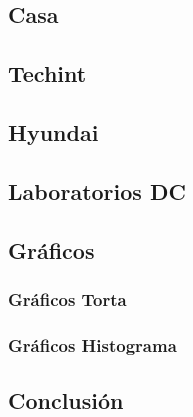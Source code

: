 \documentclass[final,narroweqnarray,inline]{ieee}
\begin{document}
  \subsection{Casa}

  \subsection{Techint}

  \subsection{Hyundai}

  \subsection{Laboratorios DC}

  \subsection{Gráficos}
  \subsubsection*{Gráficos Torta}
  \subsubsection*{Gráficos Histograma}

  \subsection{Conclusión}
\end{document}
